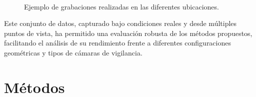 \begin{figure}[htp]
\begin{center}
    \\
\end{center}
\caption{Ejemplo de grabaciones realizadas en las diferentes ubicaciones.}
\label{fig:DataExamples}
\end{figure}

Este conjunto de datos, capturado bajo condiciones reales y desde múltiples puntos de vista, ha permitido una evaluación robusta de
los métodos propuestos, facilitando el análisis de su rendimiento frente a diferentes configuraciones geométricas y
tipos de cámaras de vigilancia.
\section{Métodos}
